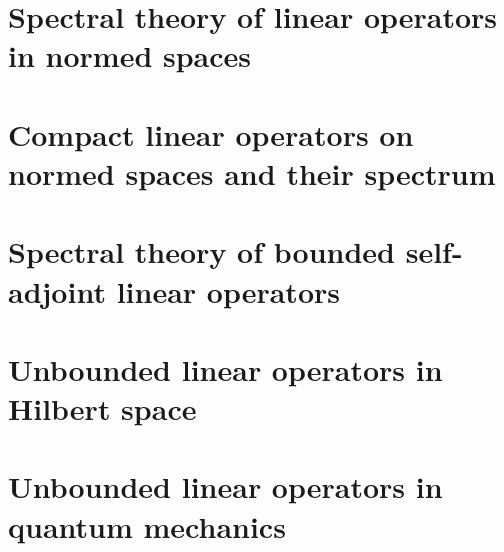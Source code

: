 \documentclass{bookSolutions}
\begin{document}
\section{Spectral theory of linear operators in normed spaces}


\section{Compact linear operators on normed spaces and their spectrum}


\section{Spectral theory of bounded self-adjoint linear operators}


\section{Unbounded linear operators in Hilbert space}


\section{Unbounded linear operators in quantum mechanics}

\end{document}
